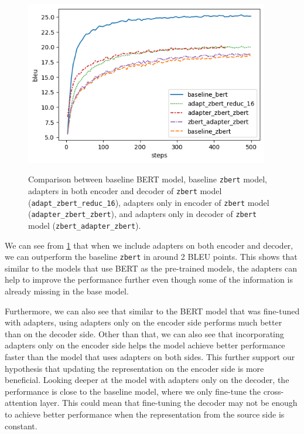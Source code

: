 \begin{figure}[h]
    {\includegraphics[width=0.95\textwidth]{img/zbert_pos.png}}
    \centering
    \caption[Comparison between baseline BERT and \texttt{zbert} models.]{Comparison between baseline BERT model, baseline \texttt{zbert} model, adapters in both encoder and decoder of \texttt{zbert} model (\texttt{adapt\_zbert\_reduc\_16}), adapters only in encoder of \texttt{zbert} model (\texttt{adapter\_zbert\_zbert}), and adapters only in decoder of \texttt{zbert} model (\texttt{zbert\_adapter\_zbert}).}
    \label{img:zbert_pos}
\end{figure}

We can see from \cref{img:zbert_pos} that when we include adapters on both encoder and decoder, we can outperform the baseline \texttt{zbert} in around 2 BLEU points. This shows that similar to the models that use BERT as the pre-trained models, the adapters can help to improve the performance further even though some of the information is already missing in the base model.

Furthermore, we can also see that similar to the BERT model that was fine-tuned with adapters, using adapters only on the encoder side performs much better than on the decoder side. Other than that, we can also see that incorporating adapters only on the encoder side helps the model achieve better performance faster than the model that uses adapters on both sides. This further support our hypothesis that updating the representation on the encoder side is more beneficial. Looking deeper at the model with adapters only on the decoder, the performance is close to the baseline model, where we only fine-tune the cross-attention layer. This could mean that fine-tuning the decoder may not be enough to achieve better performance when the representation from the source side is constant.

